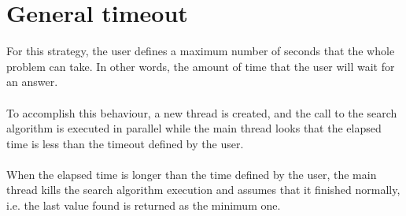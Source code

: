\section{General timeout}
For this strategy, the user defines a maximum number of seconds that the whole problem can take. In other words, the amount of time that the user will wait for an answer. \\\\
To accomplish this behaviour, a new thread is created, and the call to the search algorithm is executed in parallel while the main thread looks that the elapsed time is less than the timeout defined by the user.  \\\\
When the elapsed time is longer than the time defined by the user, the main thread kills the search algorithm execution and assumes that it finished normally, i.e. the last value found is returned as the minimum one. %
